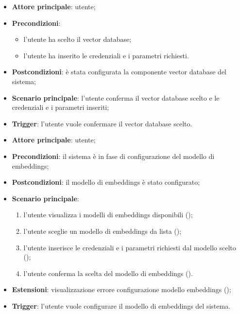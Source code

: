 \documentclass[10pt, a4paper]{article}
\begin{document}
    \begin{itemize}
        \item \textbf{Attore principale}: utente;
        \item \textbf{Precondizioni}:
            \begin{itemize}
                \item l’utente ha scelto il vector database;
                \item l’utente ha inserito le credenziali e i parametri richiesti.
            \end{itemize}
        \item \textbf{Postcondizioni}: è stata configurata la componente vector database del sistema;
        \item \textbf{Scenario principale}: l’utente conferma il vector database scelto e le credenziali e i parametri inseriti;
        \item \textbf{Trigger}: l’utente vuole confermare il vector database scelto.
    \end{itemize}


    \begin{itemize}
        \item \textbf{Attore principale}: utente;
        \item \textbf{Precondizioni}:  il sistema è in fase di configurazione del modello di embeddings;
        \item \textbf{Postcondizioni}: il modello di embeddings è stato configurato;
        \item \textbf{Scenario principale}:
            \begin{enumerate}
                \item l’utente visualizza i modelli di embeddings disponibili ();
                \item l’utente sceglie un modello di embeddings da lista ();
                \item l’utente inserisce le credenziali e i parametri richiesti dal modello scelto ();
                \item l’utente conferma la scelta del modello di embeddings ().
            \end{enumerate}
        \item \textbf{Estensioni}: visualizzazione errore configurazione modello embeddings ();
        \item \textbf{Trigger}: l’utente vuole configurare il modello di embeddings del sistema.
    \end{itemize}
\end{document}
